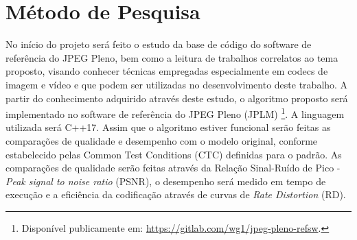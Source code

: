 \section{Método de Pesquisa}
    No início do projeto será feito o estudo da base de código do software de referência do JPEG Pleno, bem como a leitura de trabalhos correlatos ao
    tema proposto, visando conhecer técnicas empregadas especialmente em codecs de imagem e vídeo e que podem ser utilizadas no desenvolvimento deste 
    trabalho. A partir do conhecimento adquirido através deste estudo, o algoritmo proposto será implementado no software de referência do JPEG Pleno
    (JPLM) \footnote{Disponível publicamente em: \url{https://gitlab.com/wg1/jpeg-pleno-refsw}.}. A linguagem utilizada será C++17. Assim que o algoritmo 
    estiver funcional serão feitas as comparações de qualidade e desempenho com o modelo original, conforme estabelecido pelas Common Test Conditions (CTC) \cite{CTC_JPEG_Pleno}
    definidas para o padrão. As comparações de qualidade serão feitas através da Relação Sinal-Ruído de Pico - \textit{Peak signal to noise ratio} (PSNR),
    o desempenho será medido em tempo de execução e a eficiência da codificação através de curvas de \textit{Rate Distortion} (RD).
